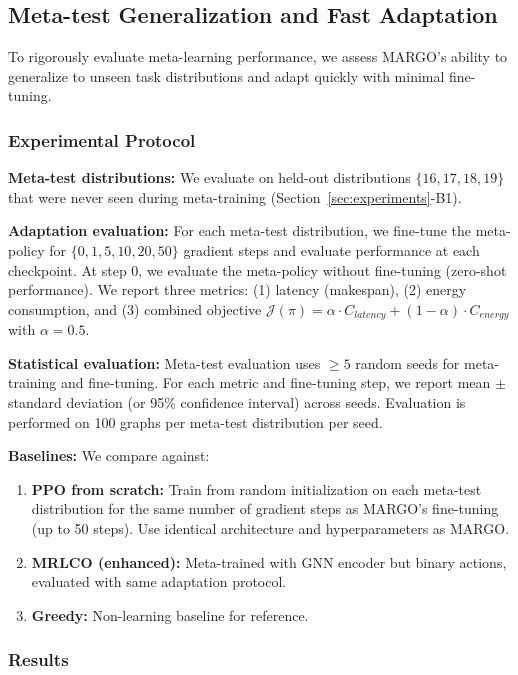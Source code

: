 \documentclass[journal,twoside]{IEEEtran}
\newcommand{\method}{\textsc{MARGO}}
\newcommand{\baseline}{\textsc{MRLCO}}
\begin{document}
\subsection{Meta-test Generalization and Fast Adaptation}
\label{sec:meta_test}

To rigorously evaluate meta-learning performance, we assess \method{}'s ability to generalize to unseen task distributions and adapt quickly with minimal fine-tuning.

\subsubsection{Experimental Protocol}

\textbf{Meta-test distributions:} We evaluate on held-out distributions $\{16, 17, 18, 19\}$ that were never seen during meta-training (Section~\ref{sec:experiments}-B1).

\textbf{Adaptation evaluation:} For each meta-test distribution, we fine-tune the meta-policy for $\{0, 1, 5, 10, 20, 50\}$ gradient steps and evaluate performance at each checkpoint. At step 0, we evaluate the meta-policy without fine-tuning (zero-shot performance). We report three metrics: (1) latency (makespan), (2) energy consumption, and (3) combined objective $\mathcal{J}(\pi) = \alpha \cdot C_{latency} + (1-\alpha) \cdot C_{energy}$ with $\alpha=0.5$.

\textbf{Statistical evaluation:} Meta-test evaluation uses $\geq 5$ random seeds for meta-training and fine-tuning. For each metric and fine-tuning step, we report mean $\pm$ standard deviation (or 95\% confidence interval) across seeds. Evaluation is performed on 100 graphs per meta-test distribution per seed.

\textbf{Baselines:} We compare against:
\begin{enumerate}
    \item \textbf{PPO from scratch:} Train from random initialization on each meta-test distribution for the same number of gradient steps as \method{}'s fine-tuning (up to 50 steps). Use identical architecture and hyperparameters as \method{}.
    \item \textbf{\baseline{} (enhanced):} Meta-trained with GNN encoder but binary actions, evaluated with same adaptation protocol.
    \item \textbf{Greedy:} Non-learning baseline for reference.
\end{enumerate}

\subsubsection{Results}
\end{document}
